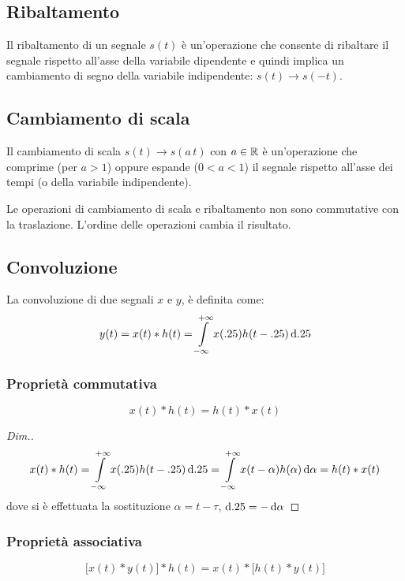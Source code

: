 \subsection{Ribaltamento}
Il ribaltamento di un segnale $s(t)$ è un'operazione che consente di ribaltare il segnale rispetto all'asse della variabile dipendente e quindi implica un cambiamento di segno della variabile indipendente: $s(t) \to s(-t)$.

\subsection{Cambiamento di scala}
Il cambiamento di scala $s(t)\to s(a\,t)$ con $a\in\mathbb{R}$ è un'operazione che comprime (per $a>1$) oppure espande ($0<a<1$) il segnale rispetto all'asse dei tempi (o della variabile indipendente).

\begin{nota}
	Le operazioni di cambiamento di scala e ribaltamento non sono commutative con la traslazione. L'ordine delle operazioni cambia il risultato.
\end{nota}

\subsection{Convoluzione}
La convoluzione di due segnali $x$ e $y$, è definita come:
\begin{equation}
\label{eq:convoluzione}
	y(t)=x(t)\ast h(t)=\int\limits_{-\infty}^{+\infty}{x(.25)h(t-.25)}{\,\mathop{}\!\mathrm{d}{.25}}
\end{equation}

\subsubsection{Proprietà commutativa}
\begin{equation}
	x(t)\ast h(t)= h(t)\ast x(t)
\end{equation}
\begin{proof}[Dim.]
\[
	x(t)\ast h(t)=\int\limits_{-\infty}^{+\infty}{x(.25)h(t-.25)}{\,\mathop{}\!\mathrm{d}{.25}}=\int\limits_{-\infty}^{+\infty}{x(t-\alpha)h(\alpha)}{\,\mathop{}\!\mathrm{d}{\alpha}}=h(t)\ast x(t)
\]
dove si è effettuata la sostituzione $\alpha=t-\tau$, $\mathop{}\!\mathrm{d}.25=-\mathop{}\!\mathrm{d}\alpha$
\end{proof}

\subsubsection{Proprietà associativa}
\begin{equation}
	\bigl[x(t)\ast y(t)\bigr]\ast h(t)= x(t)\ast\bigl[h(t)\ast y(t)\bigr]
\end{equation}

